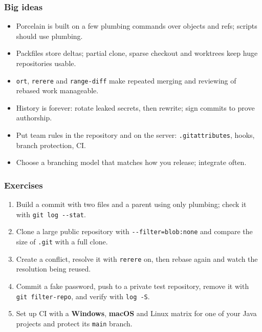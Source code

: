 \documentclass[aspectratio=169,10pt,compress]{beamer}
\newcommand{\win}{\textbf{Windows}}
\newcommand{\mac}{\textbf{macOS}}
\begin{document}




\begin{frame}[t,fragile] \frametitle{Big ideas}
  \begin{itemize}
    \item Porcelain is built on a few plumbing commands over objects and refs; scripts should use plumbing.
    \item Packfiles store deltas; partial clone, sparse checkout and worktrees keep huge repositories usable.
    \item \texttt{ort}, \texttt{rerere} and \texttt{range-diff} make repeated merging and reviewing of rebased work manageable.
    \item History is forever: rotate leaked secrets, then rewrite; sign commits to prove authorship.
    \item Put team rules in the repository and on the server: \texttt{.gitattributes}, hooks, branch protection, CI.
    \item Choose a branching model that matches how you release; integrate often.
  \end{itemize}
\end{frame}




\begin{frame}[t,fragile] \frametitle{Exercises}
  \begin{enumerate}\small
    \item Build a commit with two files and a parent using only plumbing; check it with \texttt{git log -{}-stat}.
    \item Clone a large public repository with \texttt{-{}-filter=blob:none} and compare the size of \texttt{.git} with a full clone.
    \item Create a conflict, resolve it with \texttt{rerere} on, then rebase again and watch the resolution being reused.
    \item Commit a fake password, push to a private test repository, remove it with \texttt{git filter-repo}, and verify with \texttt{log -S}.
    \item Set up CI with a \win, \mac{} and Linux matrix for one of your Java projects and protect its \texttt{main} branch.
  \end{enumerate}
\end{frame}




\begin{frame}[t,fragile]
	\begin{center}
		\vspace{4cm}
	\end{center}
\end{frame}
\end{document}
